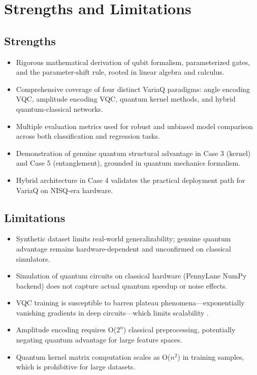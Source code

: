 \documentclass[conference]{IEEEtran}
\begin{document}
\section{Strengths and Limitations}

\subsection{Strengths}
\begin{itemize}
  \item Rigorous mathematical derivation of qubit formalism, parameterized gates, and the parameter-shift rule, rooted in linear algebra and calculus.
  \item Comprehensive coverage of four distinct VariaQ paradigms: angle encoding VQC, amplitude encoding VQC, quantum kernel methods, and hybrid quantum-classical networks.
  \item Multiple evaluation metrics used for robust and unbiased model comparison across both classification and regression tasks.
  \item Demonstration of genuine quantum structural advantage in Case 3 (kernel) and Case 5 (entanglement), grounded in quantum mechanics formalism.
  \item Hybrid architecture in Case 4 validates the practical deployment path for VariaQ on NISQ-era hardware.
\end{itemize}

\subsection{Limitations}
\begin{itemize}
  \item Synthetic dataset limits real-world generalizability; genuine quantum advantage remains hardware-dependent and unconfirmed on classical simulators.
  \item Simulation of quantum circuits on classical hardware (PennyLane NumPy backend) does not capture actual quantum speedup or noise effects.
  \item VQC training is susceptible to barren plateau phenomena---exponentially vanishing gradients in deep circuits---which limits scalability \cite{mcclean2018}.
  \item Amplitude encoding requires O($2^n$) classical preprocessing, potentially negating quantum advantage for large feature spaces.
  \item Quantum kernel matrix computation scales as O($n^2$) in training samples, which is prohibitive for large datasets.
\end{itemize}
\end{document}

